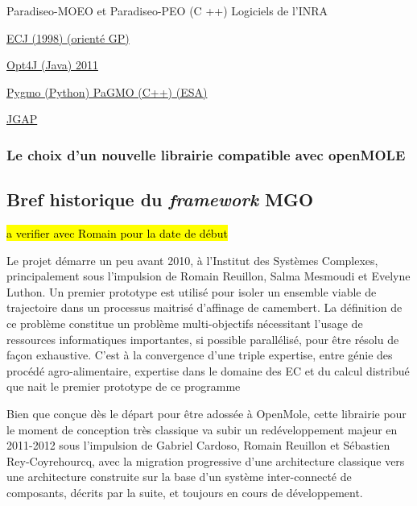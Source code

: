 Paradiseo-MOEO et Paradiseo-PEO (C ++)
Logiciels de l'INRA

\href{http://cs.gmu.edu/~eclab/projects/ecj/}{ECJ (1998) (orienté GP)}

\href{http://opt4j.sourceforge.net/}{Opt4J (Java) 2011}

\href{http://esa.github.io/pygmo/}{Pygmo (Python) PaGMO (C++) (ESA)}

\href{http://jgap.sourceforge.net/}{JGAP}


\subsubsection{Le choix d'un nouvelle librairie compatible avec openMOLE}
\label{sssec:choix_lib_EA}



\subsection{Bref historique du \textit{framework} MGO}
\label{ssec:historique_mgo}

\hl{a verifier avec Romain pour la date de début}

Le projet démarre un peu avant 2010, à l'Institut des Systèmes Complexes, principalement sous l'impulsion de Romain Reuillon, Salma Mesmoudi et Evelyne Luthon. Un premier prototype est utilisé pour isoler un ensemble viable de trajectoire dans un processus maitrisé d'affinage de camembert. La définition de ce problème constitue un problème multi-objectifs nécessitant l'usage de ressources informatiques importantes, si possible parallélisé, pour être résolu de façon exhaustive. C'est à la convergence d'une triple expertise, entre génie des procédé agro-alimentaire, expertise dans le domaine des EC et du calcul distribué que nait le premier prototype de ce programme \autocite{Mesmoudi2010}

Bien que conçue dès le départ pour être adossée à OpenMole, cette librairie pour le moment de conception très classique va subir un redéveloppement majeur en 2011-2012 sous l'impulsion de Gabriel Cardoso, Romain Reuillon et Sébastien Rey-Coyrehourcq, avec la migration progressive d'une architecture classique vers une architecture construite sur la base d'un système inter-connecté de composants, décrits par la suite, et toujours en cours de développement.

